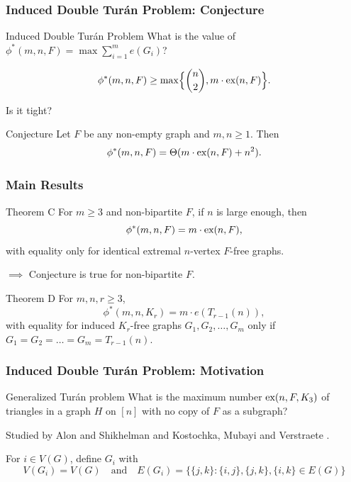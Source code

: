\documentclass{beamer}
\newcommand*{\ex}{\textnormal{ex}}
\begin{document}
\begin{frame}

  \frametitle{Induced Double Turán Problem: Conjecture}

  \begin{block}{Induced Double Turán Problem}
    What is the value of $\phi^*(m, n, F) = \max \sum_{i = 1}^m e(G_i)$?
  \end{block}

  \[
    \phi^*(m, n, F) \geq \max\Bigl\{\binom{n}{2},m \cdot \ex(n,F)\Bigr\}.
  \]

  \pause

  Is it tight?

  \pause

  \begin{block}{Conjecture}
    Let $F$ be any non-empty graph and $m, n \geq 1$. Then
    \[ 
      \phi^*(m,n,F) = \Theta(m \cdot \ex(n,F) + n^2).
    \]
  \end{block}
\end{frame}

\begin{frame}
  \frametitle{Main Results}


  \begin{block}{Theorem C}
    For $m \geq 3$ and non-bipartite $F$, if $n$ is large enough, then
    \[
      \phi^*(m, n, F) = m \cdot \ex(n, F),
    \]
    with equality only for identical extremal $n$-vertex $F$-free graphs.
  \end{block}

  \pause

  $\implies$ Conjecture is true for non-bipartite $F$.

  \vspace{0.1cm}

  \pause

  \begin{block}{Theorem D}
    For $m, n, r \geq 3$,
    \[
      \phi^*(m,n,K_{r}) = m \cdot e(T_{r - 1}(n)),
    \]
    with equality for induced $K_{r}$-free graphs $G_1, G_2, \dots, G_m$ only if $G_1 = G_2 = \dots = G_m = T_{r - 1}(n)$.  
  \end{block}
\end{frame}

\begin{frame}
  \frametitle{Induced Double Turán Problem: Motivation}

  \begin{block}{Generalized Turán problem}
    What is the maximum number $\ex(n, F, K_3)$ of triangles in a graph $H$ on $[n]$ with no copy of $F$ as a subgraph?
  \end{block}

  Studied by Alon and Shikhelman \cite{AlonShikhelman2016} and Kostochka, Mubayi and Verstraete \cite{KostochkaMubayiV2015,MubayiMukherjee2023,MubayiV2016}.

  \pause 

  \vspace{0.7cm}

  For $i \in V(G)$, define $G_i$ with
  \[
    V(G_i) = V(G) \quad \text{and} \quad E(G_i) = \{\{j, k\} : \{i, j\}, \{j, k\}, \{i, k\} \in E(G)\}
  \]
\end{frame}
\end{document}
